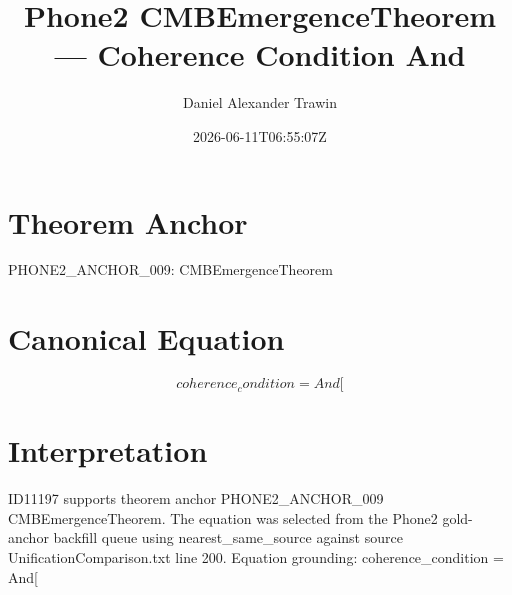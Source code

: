 \documentclass[11pt]{article}
\title{Phone2 CMBEmergenceTheorem — Coherence Condition And}
\author{Daniel Alexander Trawin}
\date{2026-06-11T06:55:07Z}
\begin{document}
\maketitle
\section*{Theorem Anchor}
PHONE2_ANCHOR_009: CMBEmergenceTheorem
\section*{Canonical Equation}
\[
coherence_condition = And[
\]
\section*{Interpretation}
ID11197 supports theorem anchor PHONE2_ANCHOR_009 CMBEmergenceTheorem. The equation was selected from the Phone2 gold-anchor backfill queue using nearest_same_source against source UnificationComparison.txt line 200. Equation grounding: coherence_condition = And[
\end{document}
